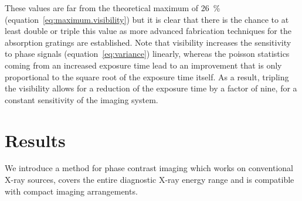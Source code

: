 These values are far from the theoretical maximum of \SI{26}{\percent}
(equation~\ref{eq:maximum.visibility}) but it is clear that there is the
chance to at least double or triple this value as more advanced fabrication
techniques for the absorption gratings are established. Note that visibility
increases the sensitivity to phase signals (equation~\ref{eq:variance})
linearly, whereas the poisson statistics coming from an increased exposure
time lead to an improvement that is only proportional to the square root of
the exposure time itself. As a result, tripling the visibility allows for a
reduction of the exposure time by a factor of nine, for a constant
sensitivity of the imaging system.

\section{Results}
We introduce a method for phase contrast imaging which works on
conventional X-ray sources, covers the entire diagnostic X-ray energy range
and is compatible with compact imaging arrangements. 

